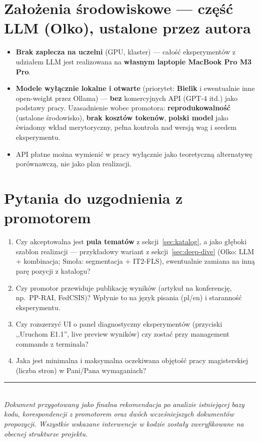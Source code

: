 \documentclass[a4paper,11pt]{article}
\begin{document}
\section{Założenia środowiskowe --- część LLM (Olko), ustalone przez autora}

\begin{itemize}[leftmargin=1.5em,itemsep=2pt]
  \item \textbf{Brak zaplecza na uczelni} (GPU, klaster) --- całość eksperymentów z udziałem LLM jest realizowana na \textbf{własnym laptopie MacBook Pro M3 Pro}.
  \item \textbf{Modele wyłącznie lokalne i otwarte} (priorytet: \textbf{Bielik} i ewentualnie inne open-weight przez Ollama) --- \textbf{bez} komercyjnych API (GPT-4 itd.) jako podstawy pracy. Uzasadnienie wobec promotora: \textbf{reprodukowalność} (ustalone środowisko), \textbf{brak kosztów tokenów}, \textbf{polski model} jako świadomy wkład merytoryczny, pełna kontrola nad wersją wag i seedem eksperymentu.
  \item API płatne można wymienić w pracy wyłącznie jako teoretyczną alternatywę porównawczą, nie jako plan realizacji.
\end{itemize}

\section{Pytania do uzgodnienia z promotorem}

\begin{enumerate}[leftmargin=1.5em,itemsep=2pt]
  \item Czy akceptowalna jest \textbf{pula tematów} z sekcji~\ref{sec:katalog}, a jako głęboki szablon realizacji --- przykładowy wariant z sekcji~\ref{sec:deep-dive} (Olko: LLM + kombinacja; Smoła: segmentacja + IT2-FLS), ewentualnie zamiana na inną parę pozycji z katalogu?
  \item Czy promotor przewiduje publikację wyników (artykuł na konferencję, np.\ PP-RAI, FedCSIS)? Wpłynie to na język pisania (pl/en) i staranność eksperymentu.
  \item Czy rozszerzyć UI o panel diagnostyczny eksperymentów (przyciski ,,Uruchom E1.1'', live preview wyników) czy zostać przy management commands z terminala?
  \item Jaka jest minimalna i maksymalna oczekiwana objętość pracy magisterskiej (liczba stron) w Pani/Pana wymaganiach?
\end{enumerate}

\vspace{2cm}
\begin{center}
\rule{0.6\textwidth}{0.4pt}\\
\textit{\small Dokument przygotowany jako finalna rekomendacja po analizie istniejącej bazy kodu, korespondencji z promotorem oraz dwóch wcześniejszych dokumentów propozycji. Wszystkie wskazane interwencje w kodzie zostały zweryfikowane na obecnej strukturze projektu.}
\end{center}
\end{document}
